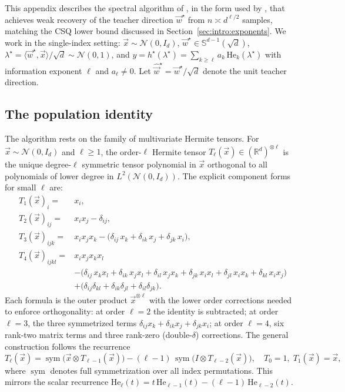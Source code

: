 This appendix describes the spectral algorithm of \citet{pmlr-v65-anandkumar17a}, in the form used by \citet{damian2024computational}, that achieves weak recovery of the teacher direction \(\vec{w}^\star\) from \(n \asymp d^{\ell/2}\) samples, matching the CSQ lower bound discussed in Section~\ref{sec:intro:exponents}. We work in the single-index setting: \(\vec{x} \sim \mathcal{N}(0, I_d)\), \(\vec{w}^\star \in \mathbb{S}^{d-1}(\sqrt{d})\), \(\lambda^\star = \langle \vec{w}^\star, \vec{x}\rangle / \sqrt{d} \sim \mathcal{N}(0,1)\), and \(y = h^\star(\lambda^\star) = \sum_{k \geq \ell} a_k\,\mathrm{He}_k(\lambda^\star)\) with information exponent \(\ell\) and \(a_\ell \neq 0\). Let \(\hat{\vec{w}}^\star = \vec{w}^\star / \sqrt{d}\) denote the unit teacher direction.

\subsection{The population identity}

The algorithm rests on the family of multivariate Hermite tensors. For \(\vec{x} \sim \mathcal{N}(0, I_d)\) and \(\ell \geq 1\), the order-\(\ell\) Hermite tensor \(T_\ell(\vec{x}) \in (\mathbb{R}^d)^{\otimes \ell}\) is the unique degree-\(\ell\) symmetric tensor polynomial in \(\vec{x}\) orthogonal to all polynomials of lower degree in \(L^2(\mathcal{N}(0,I_d))\). The explicit component forms for small \(\ell\) are:
\begin{align*}
    T_1(\vec{x})_i =& x_i, \\
    T_2(\vec{x})_{ij} =& x_i x_j - \delta_{ij}, \\
    T_3(\vec{x})_{ijk} =& x_i x_j x_k
        - \bigl(\delta_{ij}\,x_k + \delta_{ik}\,x_j + \delta_{jk}\,x_i\bigr), \\
    T_4(\vec{x})_{ijkl} =& x_i x_j x_k x_l \\
        &- \bigl(\delta_{ij}\,x_k x_l + \delta_{ik}\,x_j x_l + \delta_{il}\,x_j x_k
               + \delta_{jk}\,x_i x_l + \delta_{jl}\,x_i x_k + \delta_{kl}\,x_i x_j\bigr) \\
        & + \bigl(\delta_{ij}\delta_{kl} + \delta_{ik}\delta_{jl} + \delta_{il}\delta_{jk}\bigr).
\end{align*}
Each formula is the outer product \(\vec{x}^{\otimes \ell}\) with the lower order corrections needed to enforce orthogonality: at order \(\ell = 2\) the identity is subtracted; at order \(\ell = 3\), the three symmetrized terms \(\delta_{ij}x_k + \delta_{ik}x_j + \delta_{jk}x_i\); at order \(\ell = 4\), six rank-two matrix terms and three rank-zero (double-\(\delta\)) corrections. The general construction follows the recurrence
\begin{equation}\label{app:intro:eq:hermite-tensor-recurrence}
    T_\ell(\vec{x}) = \operatorname{sym}\!\bigl(\vec{x} \otimes T_{\ell-1}(\vec{x})\bigr)
                    - (\ell-1)\,\operatorname{sym}\!\bigl(I \otimes T_{\ell-2}(\vec{x})\bigr),
    \quad T_0 = 1,\; T_1(\vec{x}) = \vec{x},
\end{equation}
where \(\operatorname{sym}\) denotes full symmetrization over all index permutations. This mirrors the scalar recurrence \(\mathrm{He}_\ell(t) = t\,\mathrm{He}_{\ell-1}(t) - (\ell-1)\,\mathrm{He}_{\ell-2}(t)\).


